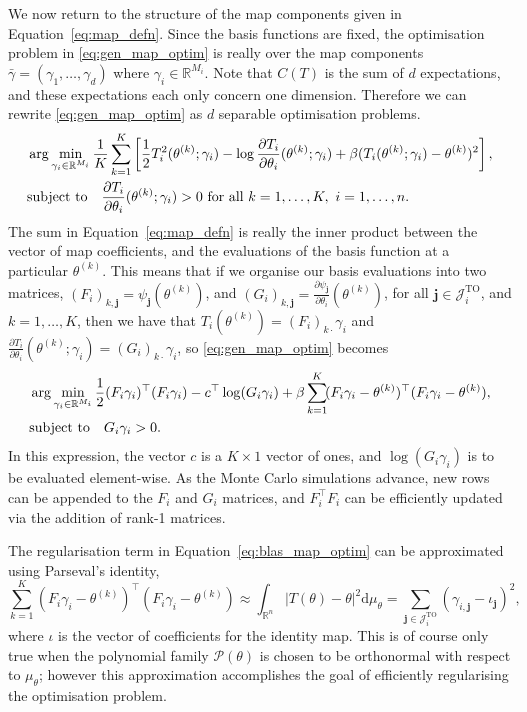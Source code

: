 \documentclass[final]{siamltex}
\begin{document}
We now return to the structure of the map components given in Equation~\eqref{eq:map_defn}. Since the basis functions are
fixed, the optimisation problem in \eqref{eq:gen_map_optim} is really over the map components $\bar{\gamma} = (\gamma_1, \dots,
\gamma_d)$ where $\gamma_i \in \mathbb{R}^{M_i}$. Note that $C(T)$ is the sum of $d$ expectations, and these expectations each only concern one dimension. Therefore we can rewrite \eqref{eq:gen_map_optim} as $d$ separable optimisation problems.
\begin{align}\label{eq:gamma_map_optim}
	&\arg\min_{\gamma_i\in\mathbb{R}^{M_i}} \frac{1}{K}\sum\limits_{k=1}^K
		\left[\frac{1}{2}T_i^2(\theta^{(k)}; \gamma_i) - \log\frac{\partial T_i}{\partial\theta_i}(\theta^{(k)}; \gamma_i) + \beta(T_i(\theta^{(k)};
		\gamma_i)-\theta^{(k)})^2\right], \\
	&\text{subject to} \quad \frac{\partial T_i}{\partial\theta_i}(\theta^{(k)};
		\gamma_i) > 0 \ \text{for all}\ k=1,\dots,K,\ i=1,\dots,n.
		\notag
\end{align}
The sum in Equation~\eqref{eq:map_defn} is really the inner
product between the vector of map coefficients, and the evaluations of the basis function at a
particular $\theta^{(k)}$. This means that if we organise our basis evaluations into two matrices,
$(F_i)_{k,\mathbf{j}} = \psi_\mathbf{j}(\theta^{(k)})$, and $(G_i)_{k,\mathbf{j}} =
\frac{\partial\psi_\mathbf{j}}{\partial\theta_i}(\theta^{(k)})$, for all $\mathbf{j}
\in \mathcal{J}_i^\text{TO}$, and $k = 1,\dots,K$, then we have that $T_i(\theta^{(k)}) = (F_i)_{k\cdot}\gamma_i$ and $\frac{\partial T_i}{\partial \theta_i}(\theta^{(k)}; \gamma_i) = (G_i)_{k\cdot}\gamma_i$, so \eqref{eq:gen_map_optim} becomes
\begin{align}\label{eq:blas_map_optim}
	&\arg\min_{\gamma_i\in\mathbb{R}^{M_i}} \frac{1}{2}(F_i\gamma_i)^\top(F_i\gamma_i) -
		c^\top\log(G_i\gamma_i) + \beta\sum\limits_{k=1}^K \!
		(F_i\gamma_i-\theta^{(k)})^\top(F_i\gamma_i-\theta^{(k)}), \\
	&\text{subject to} \quad G_i\gamma_i > 0. \notag
\end{align}
In this expression, the vector $c$ is a $K\times 1$ vector of ones, and $\log(G_i\gamma_i)$ is to be
evaluated element-wise. As the Monte Carlo simulations advance, new rows can be appended to the
$F_i$ and $G_i$ matrices, and $F_i^\top F_i$ can be efficiently updated via the addition of rank-1 matrices.

The regularisation term in Equation~\ref{eq:blas_map_optim} can be approximated using Parseval's identity,
\[
	\sum\limits_{k=1}^K \! (F_i\gamma_i-\theta^{(k)})^\top(F_i\gamma_i-\theta^{(k)}) \approx
		\int_{\mathbb{R}^n} |T(\theta)-\theta|^2 \text{d}\mu_\theta =
		\sum\limits_{\mathbf{j}\in\mathcal{J}_i^\text{TO}} (\gamma_{i,\mathbf{j}}-\iota_\mathbf{j})^2,
\]
where $\iota$ is the vector of coefficients for the identity map. This is of course only true when
the polynomial family $\mathcal{P}(\theta)$ is chosen to be orthonormal with respect to $\mu_\theta$; however this
approximation accomplishes the goal of efficiently regularising the optimisation problem.
\end{document}
